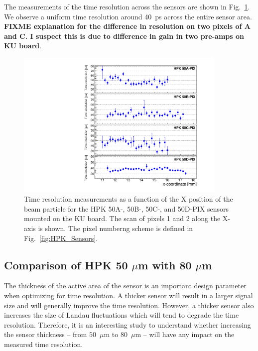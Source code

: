 \documentclass[preprint,1p]{elsarticle}
\begin{document}
The measurements of the time resolution across the sensors are shown in
Fig.~\ref{fig:KUBoard_50ABCD_TimeResolution}. We observe a uniform time
resolution around 40~ps across the entire sensor area. \textbf {FIXME explanation
for the difference in resolution on two pixels of A and C. I suspect this is due
to difference in gain in two pre-amps on KU board}.


\begin{figure}[htbp] 
\centering
\includegraphics[width=0.9\textwidth]{figs/KUBoard_HPK50ABCD/KUBoard_50ABCD_TimeResolution.pdf} 
\caption{Time resolution measurements as a function of the X position of the beam particle
for the HPK 50A-, 50B-, 50C-, and 50D-PIX sensors mounted on the KU board. The scan of 
pixels 1 and 2 along the X-axis is shown. The pixel numberng scheme is 
defined in Fig.~\ref{fig:HPK_Sensors}.} 
\label{fig:KUBoard_50ABCD_TimeResolution} 
\end{figure} 


\subsection{Comparison of HPK 50 $\mu$m with 80 $\mu$m}
\label{sec:HPK50vs80}

The thickness of the active area of the sensor is an important design parameter
when optimizing for time resolution. A thicker sensor will result in a larger
signal size and will generally improve the time resolution. However, a thicker
sensor also increases the size of Landau fluctuations which will tend to
degrade the time resolution. Therefore, it is an interesting study to understand
whether increasing the sensor thickness -- from $50$~$\mu$m to
$80$~$\mu$m -- 
will have any impact on the measured time resolution. 
\end{document}
